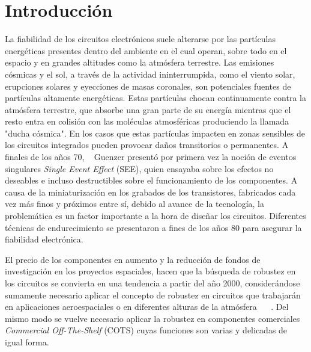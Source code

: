\documentclass[a4paper,openright,12pt]{report}
\begin{document}
\printnomenclature
\newpage



\chapter{Introducción}\label{marco del trabajo}




La fiabilidad de los circuitos electrónicos suele alterarse por las partículas energéticas presentes dentro del ambiente en el cual operan,  sobre todo en el espacio y en grandes altitudes como la atmósfera terrestre. Las emisiones cósmicas y el sol, a través de la actividad ininterrumpida, como el viento solar, erupciones solares y eyecciones de masas coronales, son potenciales fuentes de partículas altamente energéticas. Estas partículas chocan continuamente contra la atmósfera terrestre, que absorbe una gran parte de su energía mientras que el resto entra en colisión con las moléculas atmosféricas produciendo la llamada "ducha cósmica". En los casos que estas partículas impacten en  zonas sensibles de los circuitos integrados pueden provocar daños transitorios o permanentes. A finales de los años 70,  ~\cite{Guenzer1979} Guenzer presentó por primera vez la noción de eventos singulares \textit{Single Event Effect} (SEE), quien ensayaba sobre los efectos no deseables e incluso destructibles sobre el funcionamiento de los componentes. A causa de la miniaturización en los grabados de los transistores, fabricados cada vez más finos y próximos entre sí, debido al avance de la tecnología, la problemática es un  factor importante a la hora de diseñar los circuitos. Diferentes técnicas de endurecimiento se presentaron a fines de los años 80 para asegurar la fiabilidad electrónica.

El precio de los componentes en aumento y la reducción de fondos de investigación en los proyectos espaciales, hacen que la búsqueda de robustez en los circuitos se convierta en una tendencia a partir del año 2000, considerándose sumamente necesario aplicar el concepto de robustez en circuitos que trabajarán en  aplicaciones aeroespaciales o en diferentes alturas de la atmósfera  ~\cite{Chau2000} ~\cite{DiUbaldo2000}. Del mismo modo se vuelve  necesario aplicar la robustez en componentes comerciales \textit{Commercial Off-The-Shelf} (COTS) cuyas funciones son varias y  delicadas de igual forma. 
\end{document}
